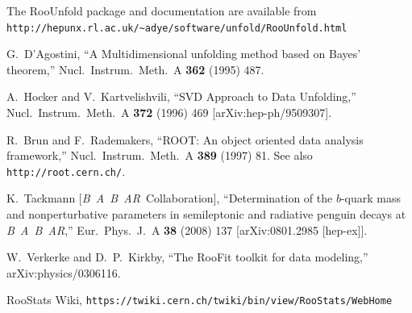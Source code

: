 \documentclass{desyproc}
\newcommand{\babar}{\mbox{\sl B\hspace{-0.4em} {\small\sl A}\hspace{-0.37em} \sl B\hspace{-0.4em} {\small\sl A\hspace{-0.02em}R}}}
\begin{document}
\begin{footnotesize}

\begin{thebibliography}{99}

  The RooUnfold package and documentation are available from\\
  \verb=http://hepunx.rl.ac.uk/~adye/software/unfold/RooUnfold.html=

  G.~D'Agostini,
  ``A Multidimensional unfolding method based on Bayes' theorem,''
  Nucl.\ Instrum.\ Meth.\  A {\bf 362} (1995) 487.

  A.~Hocker and V.~Kartvelishvili,
  ``SVD Approach to Data Unfolding,''
  Nucl.\ Instrum.\ Meth.\  A {\bf 372} (1996) 469
  [arXiv:hep-ph/9509307].

  R.~Brun and F.~Rademakers,
  ``ROOT: An object oriented data analysis framework,''
  Nucl.\ Instrum.\ Meth.\  A {\bf 389} (1997) 81.
  See also \verb=http://root.cern.ch/=.

  K.~Tackmann [\babar\ Collaboration],
  ``Determination of the $b$-quark mass and nonperturbative parameters in semileptonic and radiative penguin decays at \babar,''
  Eur.\ Phys.\ J.\  A {\bf 38} (2008) 137
  [arXiv:0801.2985 [hep-ex]].

  W.~Verkerke and D.~P.~Kirkby,
  ``The RooFit toolkit for data modeling,''
  arXiv:physics/0306116.

  RooStats Wiki,
  \verb=https://twiki.cern.ch/twiki/bin/view/RooStats/WebHome=

\end{thebibliography}

\end{footnotesize}

\end{document}
